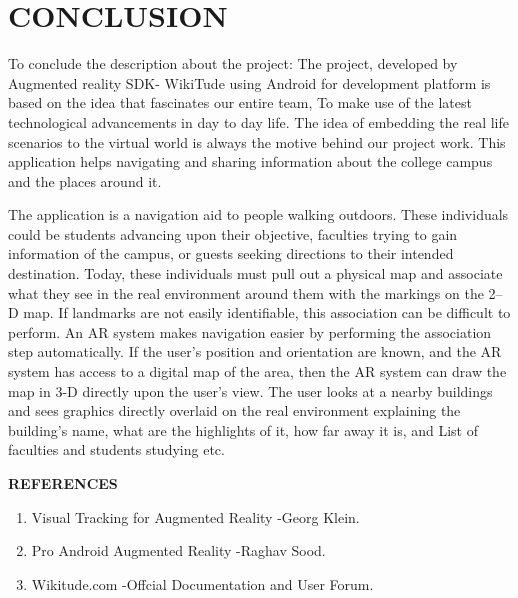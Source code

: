 \documentclass{article}
\begin{document}
\section{CONCLUSION}
\par To conclude the description about the project: The project, developed by Augmented reality SDK- WikiTude using Android for development platform is based on the idea that fascinates our entire team, To make use of the latest technological advancements in day to day life. The idea of embedding the real life scenarios to the virtual world is always the motive behind our project work. This application helps navigating and sharing information about the college campus and the places around it. 
\par The application is a navigation aid to people walking outdoors.  These individuals could be students advancing upon their objective, faculties trying to gain information of the campus, or guests seeking directions to their intended destination.  Today, these individuals must pull out a physical map and associate what they see in the real environment around them with the markings on the 2–D map.  If landmarks are not easily identifiable, this association can be difficult to perform.  An AR system makes navigation easier by performing the association step automatically.  If the user's position and orientation are known, and the AR system has access to a digital map of the area, then the AR system can draw the map in 3-D directly upon the user's view.  The user looks at a nearby buildings and sees graphics directly overlaid on the real environment explaining the building’s name, what are the highlights of it, how far away it is, and List of faculties and students studying etc. 







\newpage
% 
{\centering \Large \textbf{REFERENCES}}\\[.5cm]
\begin{enumerate}
\item Visual Tracking for Augmented Reality -Georg Klein.
\item Pro Android Augmented Reality  -Raghav Sood.
\item Wikitude.com -Offcial Documentation and User Forum.
\end{enumerate}
\end{document}
